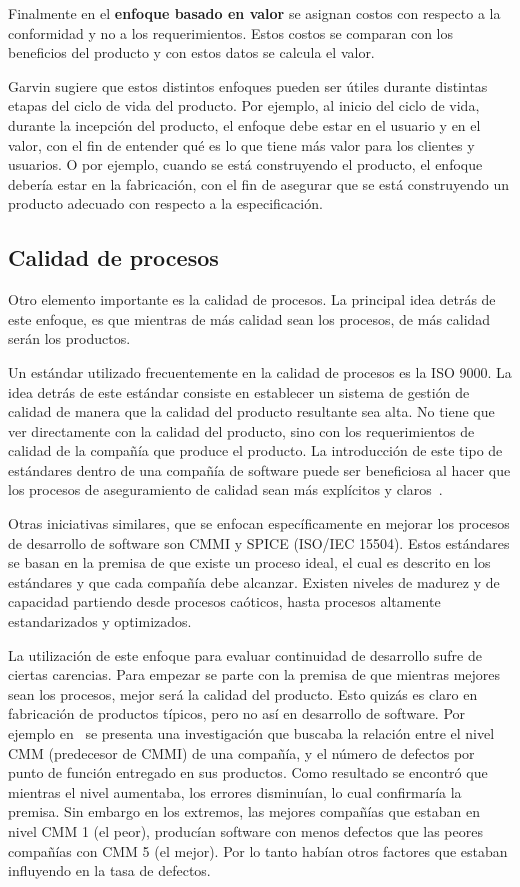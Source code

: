 Finalmente en el \textbf{enfoque basado en valor} se asignan costos con respecto a la conformidad y no
a los requerimientos. Estos costos se comparan con los beneficios del
producto y con estos datos se calcula el valor.

Garvin sugiere que estos distintos enfoques pueden ser útiles durante distintas
etapas del ciclo de vida del producto. Por ejemplo, al inicio del ciclo de 
vida, durante la incepción del producto, el enfoque debe estar en el usuario
y en el valor, con el fin de entender qué es lo que tiene más valor para
los clientes y usuarios. O por ejemplo, cuando se está construyendo el producto,
el enfoque debería estar en la fabricación, con el fin de asegurar que se está
construyendo un producto adecuado con respecto a la especificación.

\subsection{Calidad de procesos}
Otro elemento importante es la calidad de procesos. La principal idea detrás de este enfoque, es que mientras de más
calidad sean los procesos, de más calidad serán los productos.

Un estándar utilizado frecuentemente en la calidad de procesos es la ISO 9000. 
La idea detrás de este estándar consiste en establecer un sistema de gestión de calidad de
manera que la calidad del producto resultante sea alta. No tiene que ver
directamente con la calidad del producto, sino con los requerimientos de calidad
de la compañía que produce el producto.
La introducción de este tipo de estándares dentro de una compañía de software
puede ser beneficiosa al hacer que los procesos de aseguramiento de calidad sean
más explícitos y claros~\cite{Wagner:2013}.

Otras iniciativas similares, que se enfocan específicamente en mejorar los
procesos de desarrollo de software son CMMI y SPICE (ISO/IEC 15504).
Estos estándares se basan en la premisa de que existe un proceso ideal,
el cual es descrito en los estándares y que cada compañía debe alcanzar.
Existen niveles de madurez y de capacidad partiendo desde procesos caóticos,
hasta procesos altamente estandarizados y optimizados.

La utilización de este enfoque para evaluar continuidad de desarrollo sufre
de ciertas carencias. Para empezar se parte con la premisa de que mientras
mejores sean los procesos, mejor será la calidad del producto. Esto quizás
es claro en fabricación de productos típicos, pero no así en desarrollo de
software. Por ejemplo en~\cite{Jones:2000:SAB:335582} se presenta una 
investigación que buscaba la relación entre el nivel CMM (predecesor de CMMI) 
de una compañía, y el número de defectos por punto de función entregado en sus productos.
Como resultado se encontró que mientras el nivel aumentaba, los errores disminuían,
lo cual confirmaría la premisa. Sin embargo en los extremos, las mejores
compañías que estaban en nivel CMM 1 (el peor), producían software con menos
defectos que las peores compañías con CMM 5 (el mejor). Por lo tanto
habían otros factores que estaban influyendo en la tasa de defectos.

